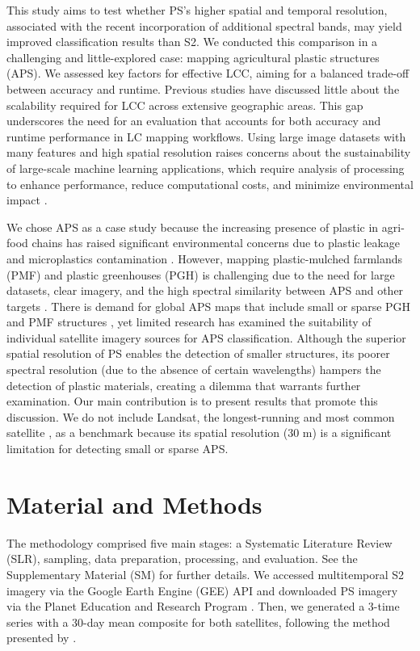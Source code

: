 \documentclass[journal]{IEEEtran}
\begin{document}
This study aims to test whether PS's higher spatial and temporal resolution, associated with the recent incorporation of additional spectral bands, may yield improved classification results than S2. We conducted this comparison in a challenging and little-explored case: mapping agricultural plastic structures (APS). We assessed key factors for effective LCC, aiming for a balanced trade-off between accuracy and runtime. Previous studies have discussed little about the scalability required for LCC across extensive geographic areas. This gap underscores the need for an evaluation that accounts for both accuracy and runtime performance in LC mapping workflows. Using large image datasets with many features and high spatial resolution raises concerns about the sustainability of large-scale machine learning applications, which require analysis of processing to enhance performance, reduce computational costs, and minimize environmental impact \cite{deVries2023, Maxwell2018}.

We chose APS as a case study because the increasing presence of plastic in agri-food chains has raised significant environmental concerns due to plastic leakage and microplastics contamination \cite{Ghaffar2022, Veettil2023, Zhang2025}. However, mapping plastic-mulched farmlands (PMF) and plastic greenhouses (PGH) is challenging due to the need for large datasets, clear imagery, and the high spectral similarity between APS and other targets \cite{deSouza2025}. There is demand for global APS maps that include small or sparse PGH and PMF structures \cite{Fabrizi2025, Lu2025, Zhang2025, Tong2024}, yet limited research has examined the suitability of individual satellite imagery sources for APS classification. Although the superior spatial resolution of PS enables the detection of smaller structures, its poorer spectral resolution (due to the absence of certain wavelengths) hampers the detection of plastic materials, creating a dilemma that warrants further examination. Our main contribution is to present results that promote this discussion. We do not include Landsat, the longest-running and most common satellite \cite{Zhang2025, Hansen&Loveland2012}, as a benchmark because its spatial resolution (30 m) is a significant limitation for detecting small or sparse APS.

\section{Material and Methods}
The methodology comprised five main stages: a Systematic Literature Review (SLR), sampling, data preparation, processing, and evaluation. See the Supplementary Material (SM) for further details. We accessed multitemporal S2 imagery via the Google Earth Engine (GEE) API \cite{Google2024} and downloaded PS imagery via the Planet Education and Research Program \cite{PlanetLabs2024}. Then, we generated a 3-time series with a 30-day mean composite for both satellites, following the method presented by \cite{deSouza2025}.
\end{document}
